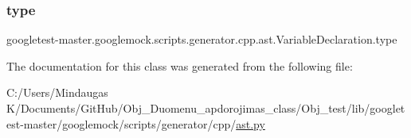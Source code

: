 \subsubsection{\texorpdfstring{type}{type}}
{\footnotesize\ttfamily googletest-\/master.\+googlemock.\+scripts.\+generator.\+cpp.\+ast.\+Variable\+Declaration.\+type}



The documentation for this class was generated from the following file\+:\begin{DoxyCompactItemize}
\item 
C\+:/\+Users/\+Mindaugas K/\+Documents/\+Git\+Hub/\+Obj\+\_\+\+Duomenu\+\_\+apdorojimas\+\_\+class/\+Obj\+\_\+test/lib/googletest-\/master/googlemock/scripts/generator/cpp/\mbox{\hyperlink{_obj__test_2lib_2googletest-master_2googlemock_2scripts_2generator_2cpp_2ast_8py}{ast.\+py}}\end{DoxyCompactItemize}
